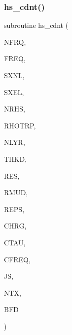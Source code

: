 \subsubsection{\texorpdfstring{hs\+\_\+cdnt()}{hs\_cdnt()}}
{\footnotesize\ttfamily subroutine hs\+\_\+cdnt (\begin{DoxyParamCaption}\item[{integer}]{N\+F\+RQ,  }\item[{real, dimension(nfrq)}]{F\+R\+EQ,  }\item[{real, dimension(4)}]{S\+X\+NL,  }\item[{real, dimension(4)}]{S\+X\+EL,  }\item[{integer}]{N\+R\+HS,  }\item[{real, dimension(nrhs)}]{R\+H\+O\+T\+RP,  }\item[{integer}]{N\+L\+YR,  }\item[{real(kind=ql), dimension(nlyr)}]{T\+H\+KD,  }\item[{real, dimension(nlyr)}]{R\+ES,  }\item[{real(kind=ql), dimension(0\+:nlyr)}]{R\+M\+UD,  }\item[{real, dimension(nlyr)}]{R\+E\+PS,  }\item[{real, dimension(nlyr)}]{C\+H\+RG,  }\item[{real, dimension(nlyr)}]{C\+T\+AU,  }\item[{real, dimension(nlyr)}]{C\+F\+R\+EQ,  }\item[{integer}]{JS,  }\item[{integer}]{N\+TX,  }\item[{complex, dimension(nfrq,1,ntx,3)}]{B\+FD }\end{DoxyParamCaption})}

